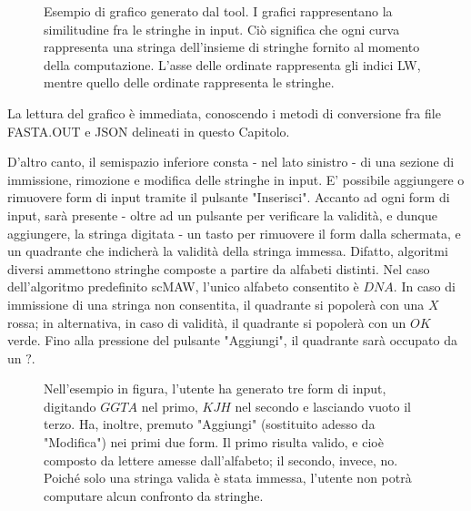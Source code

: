 \begin{figure}[ht!]
    \centering
    \caption{Esempio di grafico generato dal tool. I grafici rappresentano la similitudine fra le stringhe in input. Ciò significa che ogni curva rappresenta una stringa dell'insieme di stringhe fornito al momento della computazione. L'asse delle ordinate rappresenta gli indici LW, mentre quello delle ordinate rappresenta le stringhe.}
    \label{fig:esempio}
\end{figure}

La lettura del grafico è immediata, conoscendo i metodi di conversione fra file FASTA.OUT e JSON delineati in questo Capitolo.

\vspace{3mm}

D'altro canto, il semispazio inferiore consta - nel lato sinistro -  di una sezione di immissione, rimozione e modifica delle stringhe in input. E' possibile aggiungere o rimuovere form di input tramite il pulsante "Inserisci". Accanto ad ogni form di input, sarà presente - oltre ad un pulsante per verificare la validità, e dunque aggiungere, la stringa digitata - un tasto per rimuovere il form dalla schermata, e un quadrante che indicherà la validità della stringa immessa. Difatto, algoritmi diversi ammettono stringhe composte a partire da alfabeti distinti. Nel caso dell'algoritmo predefinito scMAW, l'unico alfabeto consentito è $DNA$. In caso di immissione di una stringa non consentita, il quadrante si popolerà con una $X$ rossa; in alternativa, in caso di validità, il quadrante si popolerà con un $OK$ verde. Fino alla pressione del pulsante "Aggiungi", il quadrante sarà occupato da un $?$.

\begin{figure}[ht!]
    \centering
    \caption{Nell'esempio in figura, l'utente ha generato tre form di input, digitando $GGTA$ nel primo, $KJH$ nel secondo e lasciando vuoto il terzo. Ha, inoltre, premuto "Aggiungi" (sostituito adesso da "Modifica") nei primi due form. Il primo risulta valido, e cioè composto da lettere amesse dall'alfabeto; il secondo, invece, no. Poiché solo una stringa valida è stata immessa, l'utente non potrà computare alcun confronto da stringhe.}
    \label{fig:esempio}
\end{figure}

